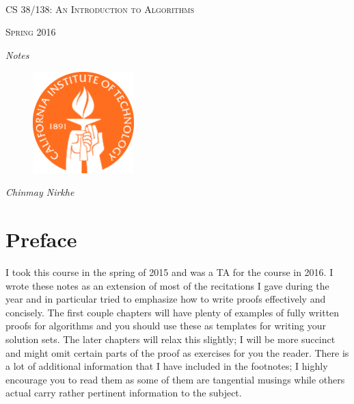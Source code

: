 \documentclass[11pt]{article}
\theoremstyle{plain}
\theoremstyle{definition}
\numberwithin{equation}{section}
\numberwithin{figure}{section}
\begin{document}
\begin{titlepage}
	\centering
	\ \\ \ \\ \ \\ \ \ \\ \ \\ \ \\ \ \\ \ \\ 
	{\scshape\LARGE CS 38/138: An Introduction to Algorithms \par}
	\vspace{1cm}
	{\scshape\Large Spring 2016\par}
	\vspace{0.5cm}
	{\Large\itshape Notes\par}
	\vspace{2cm}
	{\begin{figure}[!h]
\centering
\includegraphics[width=0.35\textwidth]{tech_seal.png}
\end{figure}}

	\vspace{3.5cm}
	{\Large\itshape Chinmay Nirkhe\par}
\end{titlepage}

\tableofcontents

\newpage

\section{Preface}
\noindent I took this course in the spring of 2015 and was a TA for the course in 2016. I wrote these notes as an extension of most of the recitations I gave during the year and in particular tried to emphasize how to write proofs effectively and concisely. The first couple chapters will have plenty of examples of fully written proofs for algorithms and you should use these as templates for writing your solution sets. The later chapters will relax this slightly; I will be more succinct and might omit certain parts of the proof as exercises for you the reader. There is a lot of additional information that I have included in the footnotes; I highly encourage you to read them as some of them are tangential musings while others actual carry rather pertinent information to the subject. \\
\end{document}
